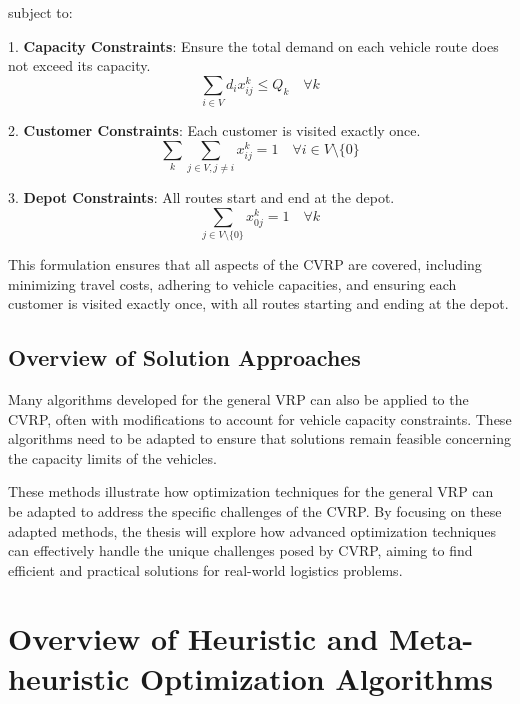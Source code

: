 \documentclass{article}
\begin{document}
    subject to:

    1. \textbf{Capacity Constraints}: Ensure the total demand on each vehicle route does not exceed its capacity.
    \begin{equation}
        \sum_{i \in V} d_i x_{ij}^k \leq Q_k \quad \forall k
    \end{equation}

    2. \textbf{Customer Constraints}: Each customer is visited exactly once.
    \begin{equation}
        \sum_{k} \sum_{j \in V, j \neq i} x_{ij}^k = 1 \quad \forall i \in V \setminus \{0\}
    \end{equation}

    3. \textbf{Depot Constraints}: All routes start and end at the depot.
    \begin{equation}
        \sum_{j \in V \setminus \{0\}} x_{0j}^k = 1 \quad \forall k
    \end{equation}

    This formulation ensures that all aspects of the CVRP are covered, including minimizing travel costs, adhering to vehicle capacities, and ensuring each customer is visited exactly once, with all routes starting and ending at the depot. \cite{toth2014vehicle}

    \subsection{Overview of Solution Approaches}\label{subsec:overview-of-solution-approaches}

    Many algorithms developed for the general VRP can also be applied to the CVRP, often with modifications to account for vehicle capacity constraints. These algorithms need to be adapted to ensure that solutions remain feasible concerning the capacity limits of the vehicles.

    These methods illustrate how optimization techniques for the general VRP can be adapted to address the specific challenges of the CVRP. By focusing on these adapted methods, the thesis will explore how advanced optimization techniques can effectively handle the unique challenges posed by CVRP, aiming to find efficient and practical solutions for real-world logistics problems.


    \section{Overview of Heuristic and Meta-heuristic Optimization Algorithms}\label{overview-of-heuristic-and-meta-heuristic-optimization-algorithms}
\end{document}
